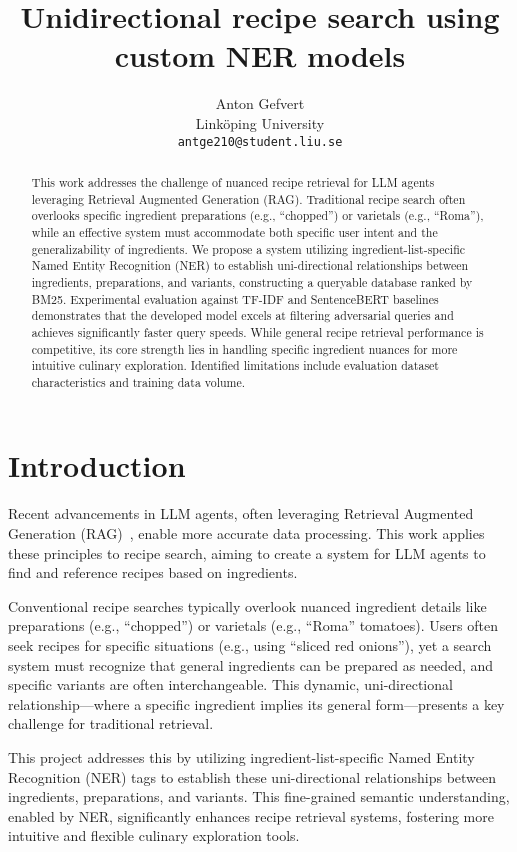 \documentclass[11pt]{article}
\title{Unidirectional recipe search using custom NER models}
\author{Anton Gefvert 
\\ Linköping University
\\ \texttt{antge210@student.liu.se} 
}
\begin{document}
\maketitle
\begin{abstract}
This work addresses the challenge of nuanced recipe retrieval for LLM agents
leveraging Retrieval Augmented Generation (RAG).
Traditional recipe search often overlooks specific ingredient preparations
(e.g., ``chopped'') or varietals (e.g., ``Roma''), while an effective system
must accommodate both specific user intent and the generalizability of
ingredients.
We propose a system utilizing ingredient-list-specific Named Entity Recognition
(NER) to establish uni-directional relationships between ingredients,
preparations, and variants, constructing a queryable database ranked by BM25.
Experimental evaluation against TF-IDF and SentenceBERT baselines demonstrates
that the developed model excels at filtering adversarial queries and achieves
significantly faster query speeds.
While general recipe retrieval performance is competitive, its core strength
lies in handling specific ingredient nuances for more intuitive culinary
exploration.
Identified limitations include evaluation dataset characteristics and training
data volume.
\end{abstract}

\section{Introduction}
Recent advancements in LLM agents, often leveraging Retrieval Augmented
Generation (RAG)~\cite{RAG}, enable more accurate data processing.
This work applies these principles to recipe search, aiming to create a system
for LLM agents to find and reference recipes based on ingredients.

Conventional recipe searches typically overlook nuanced ingredient details like
preparations (e.g., ``chopped'') or varietals (e.g., ``Roma'' tomatoes).
Users often seek recipes for specific situations (e.g., using ``sliced red
onions''), yet a search system must recognize that general ingredients can be
prepared as needed, and specific variants are often interchangeable.
This dynamic, uni-directional relationship—where a specific ingredient implies
its general form—presents a key challenge for traditional retrieval.

This project addresses this by utilizing ingredient-list-specific Named Entity
Recognition (NER) tags to establish these uni-directional relationships between
ingredients, preparations, and variants.
This fine-grained semantic understanding, enabled by NER, significantly enhances
recipe retrieval systems, fostering more intuitive and flexible culinary
exploration tools.
\end{document}
